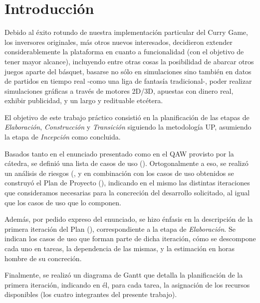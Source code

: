 \section{Introducción}
Debido al éxito rotundo de nuestra implementación particular del Curry Game, los inversores originales, más otros nuevos interesados, decidieron extender considerablemente la plataforma en cuanto a funcionalidad (con el objetivo de tener mayor alcance), incluyendo entre otras cosas la posibilidad de abarcar otros juegos aparte del básquet, basarse no sólo en simulaciones sino también en datos de partidos en tiempo real -como una liga de fantasía tradicional-, poder realizar simulaciones gráficas a través de motores 2D/3D, apuestas con dinero real, exhibir publicidad, y un largo y redituable etcétera.

El objetivo de este trabajo práctico consistió en la planificación de las etapas de \emph{Elaboración}, \emph{Construcción} y \emph{Transición} siguiendo la metodología UP, asumiendo la etapa de \emph{Incepción} como concluida. 

Basados tanto en el enunciado presentado como en el QAW provisto por la cátedra, se definió una lista de casos de uso (). Ortogonalmente a eso, se realizó un análisis de riesgos (, y en combinación con los casos de uso obtenidos se construyó el Plan de Proyecto (), indicando en el mismo las distintas iteraciones que consideramos necesarias para la concreción del desarrollo solicitado, al igual que los casos de uso que lo componen.

Además, por pedido expreso del enunciado, se hizo énfasis en la descripción de la primera iteración del Plan (), correspondiente a la etapa de \emph{Elaboración}. Se indican los casos de uso que forman parte de dicha iteración, cómo se descompone cada uno en tareas, la dependencia de las mismas, y la estimación en horas hombre de su concreción.

Finalmente, se realizó un diagrama de Gantt que detalla la planificación de la primera iteración, indicando en él, para cada tarea, la asignación de los recursos disponibles (los cuatro integrantes del presente trabajo).

